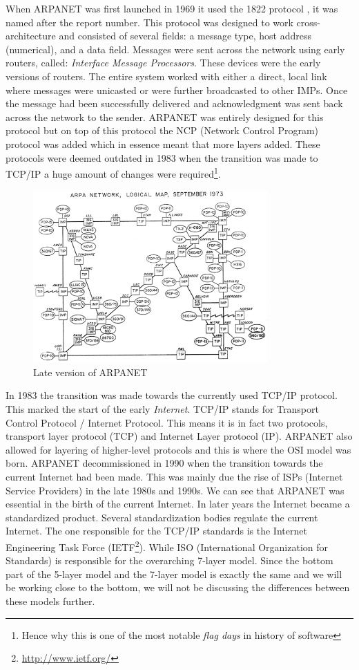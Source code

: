 \npar
When ARPANET was first launched in 1969 it used the 1822 protocol \citep{frankheart1970}, it was named after the report number. This protocol was designed to work cross-architecture and consisted of several fields: a message type, host address (numerical), and a data field. Messages were sent across the network using early routers, called: \emph{Interface Message Processors}. These devices were the early versions of routers. The entire system worked with either a direct, local link where messages were unicasted or were further broadcasted to other IMPs. Once the message had been successfully delivered and acknowledgment was sent back across the network to the sender. ARPANET was entirely designed for this protocol but on top of this protocol the NCP (Network Control Program) protocol was added which in essence meant that more layers added. These protocols were deemed outdated in 1983 when the transition was made to TCP/IP a huge amount of changes were required\footnote{Hence why this is one of the most notable \emph{flag days} in history of software}.
\npar
\begin{figure}[H]
    \centering
    \includegraphics[width=0.8\textwidth]{figures/latearpanet}
    \caption{Late version of ARPANET \citep{vrijders2014prototyping}} 
    \label{fig:latearpanet}
\end{figure}
\npar
In 1983 the transition was made towards the currently used TCP/IP protocol. This marked the start of the early \emph{Internet}. TCP/IP stands for Transport Control Protocol / Internet Protocol. This means it is in fact two protocols, transport layer protocol (TCP) and Internet Layer protocol (IP). ARPANET also allowed for layering of higher-level protocols and this is where the OSI model was born. ARPANET decommissioned in 1990 when the transition towards the current Internet had been made. This was mainly due the rise of ISPs (Internet Service Providers) in the late 1980s and 1990s. We can see that ARPANET was essential in the birth of the current Internet. 
\npar
In later years the Internet became a standardized product. Several standardization bodies regulate the current Internet. The one responsible for the TCP/IP standards is the Internet Engineering Task Force (IETF\footnote{\url{http://www.ietf.org/}}). While ISO (International Organization for Standards) is responsible for the overarching 7-layer model. Since the bottom part of the 5-layer model and the 7-layer model is exactly the same and we will be working close to the bottom, we will not be discussing the differences between these models further.


